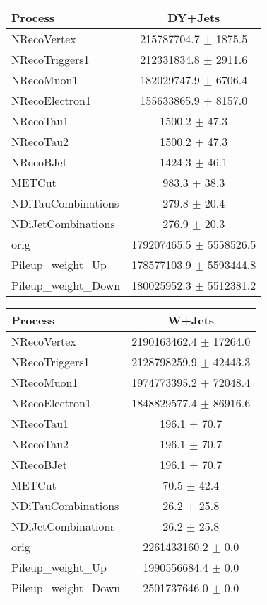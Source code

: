 \begin{tabular}{ | l | c | }
\hline
Process & DY+Jets\\ \hline
NRecoVertex & 215787704.7 $\pm$ 1875.5 \\ \hline
NRecoTriggers1 & 212331834.8 $\pm$ 2911.6 \\ \hline
NRecoMuon1 & 182029747.9 $\pm$ 6706.4 \\ \hline
NRecoElectron1 & 155633865.9 $\pm$ 8157.0 \\ \hline
NRecoTau1 & 1500.2 $\pm$ 47.3 \\ \hline
NRecoTau2 & 1500.2 $\pm$ 47.3 \\ \hline
NRecoBJet & 1424.3 $\pm$ 46.1 \\ \hline
METCut & 983.3 $\pm$ 38.3 \\ \hline
NDiTauCombinations & 279.8 $\pm$ 20.4 \\ \hline
NDiJetCombinations & 276.9 $\pm$ 20.3 \\ \hline
orig & 179207465.5 $\pm$ 5558526.5 \\ \hline
Pileup_weight_Up & 178577103.9 $\pm$ 5593444.8 \\ \hline
Pileup_weight_Down & 180025952.3 $\pm$ 5512381.2 \\ \hline
\end{tabular}

\begin{tabular}{ | l | c | }
\hline
Process & W+Jets\\ \hline
NRecoVertex & 2190163462.4 $\pm$ 17264.0 \\ \hline
NRecoTriggers1 & 2128798259.9 $\pm$ 42443.3 \\ \hline
NRecoMuon1 & 1974773395.2 $\pm$ 72048.4 \\ \hline
NRecoElectron1 & 1848829577.4 $\pm$ 86916.6 \\ \hline
NRecoTau1 & 196.1 $\pm$ 70.7 \\ \hline
NRecoTau2 & 196.1 $\pm$ 70.7 \\ \hline
NRecoBJet & 196.1 $\pm$ 70.7 \\ \hline
METCut & 70.5 $\pm$ 42.4 \\ \hline
NDiTauCombinations & 26.2 $\pm$ 25.8 \\ \hline
NDiJetCombinations & 26.2 $\pm$ 25.8 \\ \hline
orig & 2261433160.2 $\pm$ 0.0 \\ \hline
Pileup_weight_Up & 1990556684.4 $\pm$ 0.0 \\ \hline
Pileup_weight_Down & 2501737646.0 $\pm$ 0.0 \\ \hline
\end{tabular}